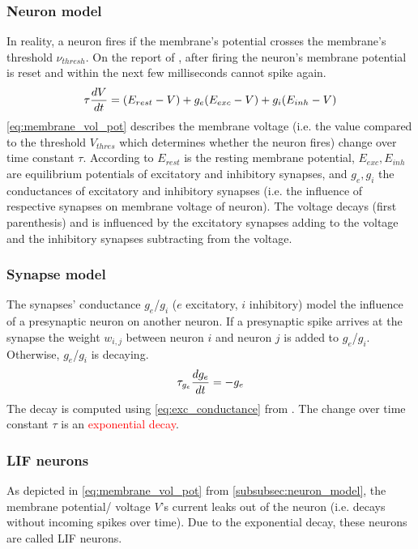 \subsubsection{Neuron model}
\label{subsubsec:neuron_model}
In reality, a neuron fires if the membrane's potential crosses the membrane's threshold $\nu_{thresh}$.
On the report of \cite{SNN}, after firing the neuron's membrane potential is reset and within the next few milliseconds cannot spike again.
%
\begin{equation}
    \centering
    \label{eq:membrane_vol_pot}
    \tau \frac{dV}{dt} = (E_{rest} - V) + g_e(E_{exc} - V) + g_i(E_{inh} - V)
\end{equation}
%
\autoref{eq:membrane_vol_pot} describes the membrane voltage (i.e. the value compared to the threshold $V_{thres}$ which determines whether the neuron fires) change over time constant $\tau$.
According to \cite{SNN} $E_{rest}$ is the resting membrane potential, $E_{exc}, E_{inh}$ are equilibrium potentials of excitatory and inhibitory synapses, and $g_e, g_i$ the conductances of excitatory and inhibitory synapses (i.e. the influence of respective synapses on membrane voltage of neuron). 
The voltage decays (first parenthesis) and is influenced by the excitatory synapses adding to the voltage and the inhibitory synapses subtracting from the voltage.

\subsubsection{Synapse model}
\label{subsubsec:synapse_model}
The synapses' conductance $g_e$/$g_i$ ($e$ excitatory, $i$ inhibitory) model the influence of a presynaptic neuron on another neuron.
If a presynaptic spike arrives at the synapse the weight $w_{i,j}$ between neuron $i$ and neuron $j$ is added to $g_e$/$g_i$.
Otherwise, $g_e$/$g_i$ is decaying.
%
\begin{equation}
    \centering
    \label{eq:exc_conductance}
    \tau_{g_e} \frac{dg_e}{dt} = - g_e
\end{equation}
%
The decay is computed using \autoref{eq:exc_conductance} from \cite{SNN}.
The change over time constant $\tau$ is an \textcolor{red}{exponential decay}.


\subsubsection{\ac{LIF} neurons}
As depicted in \autoref{eq:membrane_vol_pot} from \autoref{subsubsec:neuron_model}, the membrane potential/ voltage $V$'s current leaks out of the neuron (i.e. decays without incoming spikes over time).
Due to the exponential decay, these neurons are called \ac{LIF} neurons.


